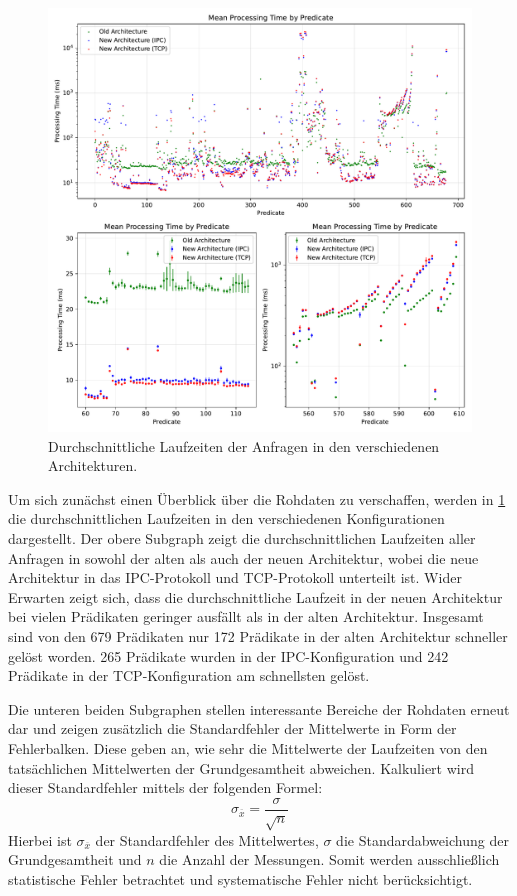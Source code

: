 \begin{figure}[!htp]
    \centering
    \includegraphics[scale=.55]{./PerformanceEvaluation/processingtime.pdf}
    \caption{Durchschnittliche Laufzeiten der Anfragen in den verschiedenen Architekturen.}
    \label{fig:performance-overview}
\end{figure}

Um sich zunächst einen Überblick über die Rohdaten zu verschaffen,
werden in \cref{fig:performance-overview} die durchschnittlichen Laufzeiten in den verschiedenen Konfigurationen dargestellt.
Der obere Subgraph zeigt die durchschnittlichen Laufzeiten aller Anfragen in sowohl der alten als auch der neuen Architektur,
wobei die neue Architektur in das IPC-Protokoll und TCP-Protokoll unterteilt ist.
Wider Erwarten zeigt sich, dass die durchschnittliche Laufzeit in der neuen Architektur bei vielen Prädikaten geringer ausfällt als in der alten Architektur.
Insgesamt sind von den 679 Prädikaten nur 172 Prädikate in der alten Architektur schneller gelöst worden.
265 Prädikate wurden in der IPC-Konfiguration und 242 Prädikate in der TCP-Konfiguration am schnellsten gelöst.

Die unteren beiden Subgraphen stellen interessante Bereiche der Rohdaten erneut dar und zeigen zusätzlich
die Standardfehler der Mittelwerte in Form der Fehlerbalken. Diese geben an, wie sehr die
Mittelwerte der Laufzeiten von den tatsächlichen Mittelwerten der Grundgesamtheit abweichen.
Kalkuliert wird dieser Standardfehler mittels der folgenden Formel:
\begin{equation}
    \sigma_{\overline{x}} = \frac{\sigma}{\sqrt{n}}
\end{equation}
Hierbei ist $\sigma_{\overline{x}}$ der Standardfehler des Mittelwertes, $\sigma$ die Standardabweichung der Grundgesamtheit und $n$ die Anzahl der Messungen.
Somit werden ausschließlich statistische Fehler betrachtet und systematische Fehler nicht berücksichtigt.


